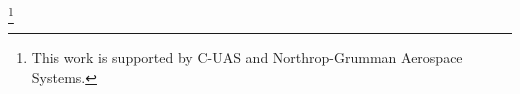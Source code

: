 \documentclass[manuscript, review, screen]{acmart}
\begin{document}

%
%



\thanks{This work is supported by C-UAS and Northrop-Grumman Aerospace Systems.}


\maketitle

% 
% 







\end{document}
